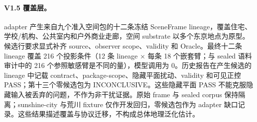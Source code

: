 \documentclass[UTF8,11pt]{ctexart}
\begin{document}
\paragraph{V1.5 覆盖层。} adapter 产生来自九个准入空间包的十二条冻结 SceneFrame lineage，覆盖住宅、学校/机构、公共室内和户外商业走廊，空间 substrate 以多个东京地点为原型。候选行要求显式补齐 source、observer scope、validity 和 Oracle。最终十二条 lineage 覆盖 216 个投影条件（12 条 lineage × 每条 18 个嵌套臂；与 sealed 语料审计中的 216 个参照敏感臂是不同的量），模型调用为 0。历史报告在产生候选的 lineage 中记载 contract、package-scope、隐藏平面扰动、validity 和可见正控 PASS；第十三个零候选包为 INCONCLUSIVE。这些隐藏平面 PASS 不能克服隐藏输入被丢弃的问题，不作为非干扰证据。原始 frame 与 sealed corpus 保持隔离；sunshine-city 与荒川 fixture 仅作开发回归，零候选包作为 adapter 缺口记录。这些结果描述覆盖与协议迁移，不构成总体地理泛化估计。
\end{document}
